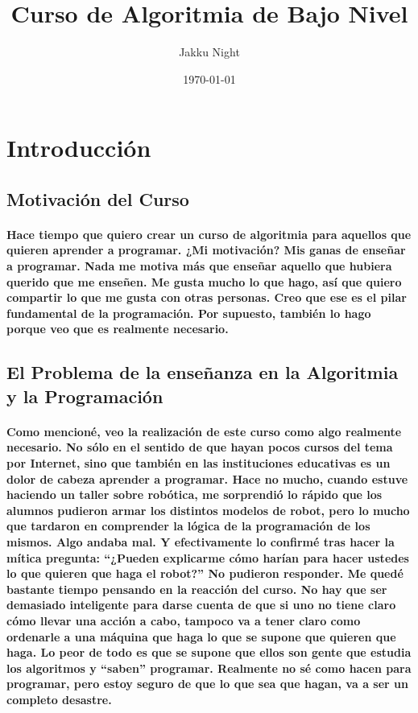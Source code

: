 \documentclass[a4paper, 10pt]{article}
\title{Curso de Algoritmia de Bajo Nivel}
\author{Jakku Night}
\date{\today}
\begin{document}
    \maketitle
    \newpage
    \section*{Introducción}
    \subsection*{Motivación del Curso}
    \paragraph{
        Hace tiempo que quiero crear un curso de algoritmia para aquellos que quieren aprender a programar. 
        ¿Mi motivación? Mis ganas de enseñar a programar. Nada me motiva más que enseñar aquello que hubiera querido que me enseñen. 
        Me gusta mucho lo que hago, así que quiero compartir lo que me gusta con otras personas. Creo que ese es el pilar fundamental de 
        la programación. Por supuesto, también lo hago porque veo que es realmente necesario.
    }
    \subsection*{El Problema de la enseñanza en la Algoritmia y la Programación}
    \paragraph{
        Como mencioné, veo la realización de este curso como algo realmente necesario. No sólo en el sentido de que hayan pocos cursos 
        del tema por Internet, sino que también en las instituciones educativas es un dolor de cabeza aprender a programar. Hace no mucho, 
        cuando estuve haciendo un taller sobre robótica, me sorprendió lo rápido que los alumnos pudieron armar los distintos modelos de robot, 
        pero lo mucho que tardaron en comprender la lógica de la programación de los mismos. Algo andaba mal. Y efectivamente lo confirmé tras 
        hacer la mítica pregunta: ``¿Pueden explicarme cómo harían para hacer ustedes lo que quieren que haga el robot?'' No pudieron responder. 
        Me quedé bastante tiempo pensando en la reacción del curso. No hay que ser demasiado inteligente para darse cuenta de que si uno 
        no tiene claro cómo llevar una acción a cabo, tampoco va a tener claro como ordenarle a una máquina que haga lo que se supone que quieren 
        que haga. Lo peor de todo es que se supone que ellos son gente que estudia los algoritmos y ``saben'' programar. Realmente no sé como 
        hacen para programar, pero estoy seguro de que lo que sea que hagan, va a ser un completo desastre.
    }
\end{document}
